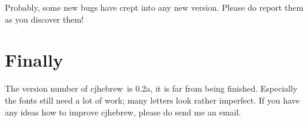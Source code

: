 \documentclass[a4paper,10pt]{article}
\def\cjh{\textsf{cjhebrew}}
\def\cjhebversion{0.2a}
\begin{document}
Probably, some new bugs have crept into any new version. Please do
report them as you discover them!


\section{Finally}

The version number of \cjh\ is \cjhebversion, it is far from being
finished. Especially the fonts still need a lot of work; many
letters look rather imperfect. If you have any ideas how to
improve \cjh, please do send me an email.
\end{document}
